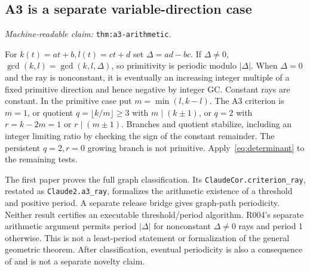 \documentclass[11pt]{amsart}
\newcommand{\record}[1]{\nolinkurl{#1}}
\newcommand{\claimid}[1]{\par\nopagebreak\noindent\textit{Machine-readable claim:} \record{#1}.\par}
\theoremstyle{definition}\newtheorem{definition}{Definition}
\begin{document}
\subsection{A3 is a separate variable-direction case}\label{thm:a3-arithmetic}
\claimid{thm:a3-arithmetic}
For $k(t)=at+b,l(t)=ct+d$ set $\Delta=ad-bc$. If $\Delta\ne0$,
$\gcd(k,l)=\gcd(k,l,\Delta)$, so primitivity is periodic modulo
$|\Delta|$. When $\Delta=0$ and the ray is nonconstant, it is
eventually an increasing integer multiple of a fixed primitive
direction and hence negative by integer GC. Constant rays are constant.
In the primitive case put $m=\min(l,k-l)$. The A3 criterion is
$m=1$, or quotient $q=\lfloor k/m\rfloor\ge3$ with $m\mid(k\pm1)$,
or $q=2$ with $r=k-2m=1$ or $r\mid(m\pm1)$. Branches and quotient
stabilize, including an integer limiting ratio by checking the sign
of the constant remainder. The persistent $q=2,r=0$ growing branch
is not primitive. Apply~\eqref{eq:determinant} to the remaining tests.

The first paper proves the full graph classification. Its
\record{ClaudeCor.criterion_ray}, restated as \record{Claude2.a3_ray},
formalizes the arithmetic existence of a threshold and positive
period. A separate release bridge gives graph-path periodicity.
Neither result certifies an executable threshold/period algorithm.
R004's separate arithmetic argument permits period $|\Delta|$ for
nonconstant $\Delta\ne0$ rays and period 1 otherwise. This is not a
least-period statement or formalization of the general geometric
theorem. After classification, eventual periodicity is also a
consequence of \cite[Theorem 1.15]{BGW} and is not a separate novelty claim.
\end{document}
